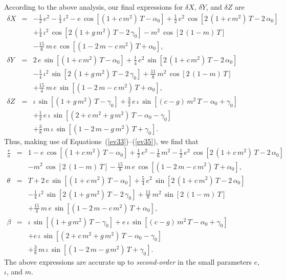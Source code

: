  According to the above analysis, our final expressions for $\delta X$, $\delta Y$, and $\delta Z$  are
 \begin{eqnarray}
 \delta X &=& -\frac{1}{2}\,e^2-\frac{1}{4}\,\iota^2 - e\,\cos[(1+c\,m^2)\,T-\alpha_0] + \frac{1}{2}\,e^2\,\cos[2\,(1+c\,m^2)\,T-2\,\alpha_0]\nonumber\\[0.5ex]
 &&+ \frac{1}{4}\,\iota^2\,\cos[2\,(1+g\,m^2)\,T-2\,\gamma_0] - m^2\,\cos[2\,(1-m)\,T]\nonumber\\[0.5ex]
 &&-\frac{15}{8}\,m\,e\,\cos[(1-2\,m-c\,m^2)\,T+\alpha_0],\\[0.5ex]
  \delta Y &=& 2\,e\,\sin[(1+c\,m^2)\,T-\alpha_0] + \frac{1}{4}\,e^2\,\sin[2\,(1+c\,m^2)\,T-2\,\alpha_0]\nonumber\\[0.5ex]
 &&- \frac{1}{4}\,\iota^2\,\sin[2\,(1+g\,m^2)\,T-2\,\gamma_0] + \frac{11}{8}\,m^2\,\cos[2\,(1-m)\,T]\nonumber\\[0.5ex]
&&+\frac{15}{4}\,m\,e\,\sin[(1-2\,m-c\,m^2)\,T+\alpha_0],\\[0.5ex]
\delta Z &=& \iota\,\sin[(1+g\,m^2)\,T-\gamma_0] + \frac{3}{2}\,e\,\iota\,\sin[(c-g)\,m^2\,T-\alpha_0+\gamma_0]\nonumber\\[0.5ex]
&&+\frac{1}{2}\,e\,\iota\,\sin [(2+c\,m^2+g\,m^2)\,T-\alpha_0-\gamma_0]\nonumber\\[0.5ex]
&&+\frac{3}{8}\,m\,\iota\,\sin[(1-2\,m-g\,m^2)\,T+\gamma_0].
 \end{eqnarray}
 Thus, making use of Equations~(\ref{ev33})--(\ref{ev35}), we find that
 \begin{eqnarray}\label{ev95}
 \frac{r}{a} &=&1  - e\,\cos[(1+c\,m^2)\,T-\alpha_0] +\frac{1}{2}\,e^2 - \frac{1}{6}\,m^2- \frac{1}{2}\,e^2\,\cos[2\,(1+c\,m^2)\,T-2\,\alpha_0]\nonumber\\[0.5ex]
 &&- m^2\,\cos[2\,(1-m)\,T]-\frac{15}{8}\,m\,e\,\cos[(1-2\,m-c\,m^2)\,T+\alpha_0],\\[0.5ex]
  \theta &=& T + 2\,e\,\sin[(1+c\,m^2)\,T-\alpha_0] + \frac{5}{4}\,e^2\,\sin[2\,(1+c\,m^2)\,T-2\,\alpha_0]\nonumber\\[0.5ex]
 &&- \frac{1}{4}\,\iota^2\,\sin[2\,(1+g\,m^2)\,T-2\,\gamma_0] + \frac{11}{8}\,m^2\,\sin[2\,(1-m)\,T]\nonumber\\[0.5ex]
&&+\frac{15}{4}\,m\,e\,\sin[(1-2\,m-c\,m^2)\,T+\alpha_0],\label{ev96}\\[0.5ex]
\beta &=& \iota\,\sin[(1+g\,m^2)\,T-\gamma_0] + e\,\iota\,\sin[(c-g)\,m^2\,T-\alpha_0+\gamma_0]\nonumber\\[0.5ex]
&&+e\,\iota\,\sin [(2+c\,m^2+g\,m^2)\,T-\alpha_0-\gamma_0]\nonumber\\[0.5ex]
&&+\frac{3}{8}\,m\,\iota\,\sin[(1-2\,m-g\,m^2)\,T+\gamma_0].\label{ev97}
 \end{eqnarray}
 The above expressions are accurate up to {\em second-order}\/ in the small parameters $e$, $\iota$, and $m$. 
 
